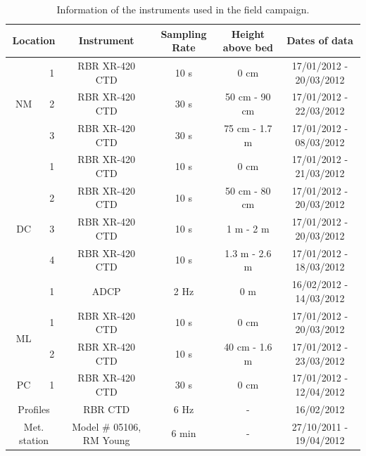 \documentclass[tesis.tex]{subfiles}
\begin{document}
\begin{table}[h!]
    \centering
    \caption{Information of the instruments used in the field campaign.}
    \begin{tabular}{|cc|c|c|c|c|}
    \hline
    \multicolumn{2}{|c|}{Location}                & Instrument & Sampling Rate & Height above bed & Dates of data           \\ \hline
    \multicolumn{1}{|c|}{\multirow{3}{*}{NM}} & 1 & RBR XR-420 CTD    & 10 s          & 0 cm             & 17/01/2012 - 20/03/2012 \\ \cline{2-6} 
    \multicolumn{1}{|c|}{}                    & 2 & RBR XR-420 CTD    & 30 s          & 50 cm - 90 cm    & 17/01/2012 - 22/03/2012 \\ \cline{2-6} 
    \multicolumn{1}{|c|}{}                    & 3 & RBR XR-420 CTD    & 30 s          & 75 cm -  1.7 m   & 17/01/2012 - 08/03/2012 \\ \hline
    \multicolumn{1}{|c|}{\multirow{5}{*}{DC}} & 1 & RBR XR-420 CTD    & 10 s          & 0 cm             & 17/01/2012 - 21/03/2012 \\ \cline{2-6} 
    \multicolumn{1}{|c|}{}                    & 2 & RBR XR-420 CTD    & 10 s          & 50 cm - 80 cm    & 17/01/2012 - 20/03/2012 \\ \cline{2-6} 
    \multicolumn{1}{|c|}{}                    & 3 & RBR XR-420 CTD    & 10 s          & 1 m - 2 m        & 17/01/2012 - 20/03/2012 \\ \cline{2-6} 
    \multicolumn{1}{|c|}{}                    & 4 & RBR XR-420 CTD    & 10 s          & 1.3 m - 2.6 m    & 17/01/2012 - 18/03/2012 \\ \cline{2-6} 
    \multicolumn{1}{|c|}{} & \multicolumn{1}{c|}{1} & \multicolumn{1}{c|}{ADCP} & 2 Hz & \multicolumn{1}{c|}{0 m} & \multicolumn{1}{c|}{16/02/2012 - 14/03/2012} \\ \hline
    \multicolumn{1}{|c|}{\multirow{2}{*}{ML}} & 1 & RBR XR-420 CTD    & 10 s          & 0 cm             & 17/01/2012 - 20/03/2012 \\ \cline{2-6} 
    \multicolumn{1}{|c|}{}                    & 2 & RBR XR-420 CTD    & 10 s          & 40 cm - 1.6 m    & 17/01/2012 - 23/03/2012 \\ \hline
    \multicolumn{1}{|c|}{PC}                  & 1 & RBR XR-420 CTD    & 30 s          & 0 cm             & 17/01/2012 - 12/04/2012 \\ \hline
    \multicolumn{2}{|c|}{Profiles}               & RBR CTD    & 6 Hz          & -                & 16/02/2012              \\ \hline
    \multicolumn{2}{|c|}{Met. station}               & Model \# 05106, RM Young    & 6 min          & -                & 27/10/2011 - 19/04/2012  \\ \hline
    \end{tabular}
    \label{tab:instr}
    \end{table}
\end{document}
